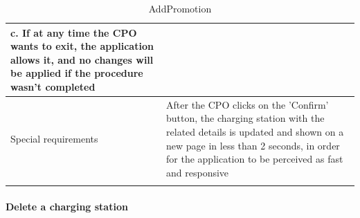\begin{center}
\begin{longtable}{p{4cm} p{11cm}}
                    c. If at any time the CPO wants to exit, the application allows it, and no changes will be applied if the procedure wasn't completed \\
     \hline
     Special requirements & After the CPO clicks on the 'Confirm' button, the charging station with the related details is updated and shown on a new page in less than 2 seconds, in order for the application to be perceived as fast and responsive\\
     \hline
    \caption{AddPromotion}
    \label{tab:AddPromotion}
    \end{longtable}
\end{center}

\paragraph{Delete a charging station}

